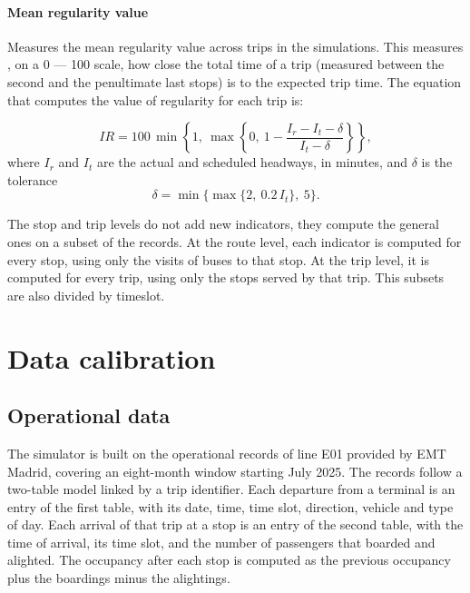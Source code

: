 \documentclass[a4paper,fleqn]{cas-sc}
\begin{document}
\paragraph{Mean regularity value} Measures the mean regularity value across
trips in the simulations. This measures , on a 0 --- 100 scale, how close the total
time of a trip (measured between the second and the penultimate last stops) is to
the expected trip time. The equation that computes the value of regularity for
each trip is:

\begin{equation}\label{eq:regularity}
\mathit{IR} = 100\,\min\!\left\{1,\ \max\!\left\{0,\
  1 - \frac{I_r - I_t - \delta}{I_t - \delta}\right\}\right\},
\end{equation}
\noindent where $I_r$ and $I_t$ are the actual and scheduled headways, in
minutes, and $\delta$ is the tolerance
\begin{equation}\label{eq:tolerance}
\delta = \min\bigl\{\max\{2,\ 0.2\,I_t\},\ 5\bigr\}.
\end{equation}

The stop and trip levels do not add new indicators, they compute the general
ones on a subset of the records. At the route level, each indicator is computed
for every stop, using only the visits of buses to that stop. At the trip level,
it is computed for every trip, using only the stops served by that trip.
This subsets are also divided by timeslot.




\section{Data calibration}\label{sec:data}

\subsection{Operational data}\label{sec:data_source}

The simulator is built on the operational records of line E01 provided by
EMT Madrid, covering an eight-month window starting July 2025.
The records follow a two-table model linked by a trip identifier. Each
departure from a terminal is an entry of the first table, with its date,
time, time slot, direction, vehicle and type of day. Each arrival of that
trip at a stop is an entry of the second table, with the time of arrival, its
time slot, and the number of passengers that boarded and alighted. The
occupancy after each stop is computed as the previous occupancy plus the
boardings minus the alightings.
\end{document}
